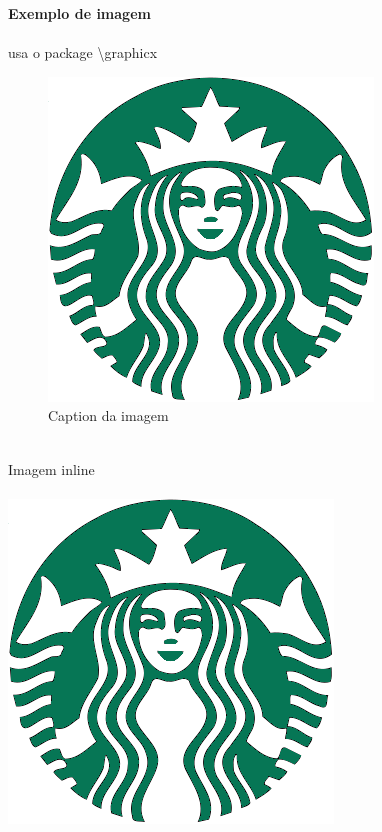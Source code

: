 \documentclass[12pt,a4paper]{article}
\makeatletter
\def\maxwidth#1{\ifdim\Gin@nat@width>#1 #1\else\Gin@nat@width\fi}
\makeatother
\begin{document}
\noindent{}\textbf{Exemplo de imagem}\\
\\ usa o package \textbackslash{graphicx}

\begin{figure}[!ht]

	\centering

	\includegraphics[width=\maxwidth{0.5\textwidth},keepaspectratio]{image.png}
	\caption{Caption da imagem} 
	\label{Label da imagem} 

\end{figure}

\noindent\\
\noindent Imagem inline\\
\noindent\\
\lipsum
\includegraphics[width=\maxwidth{0.5\textwidth}, height=\textheight,keepaspectratio]{image.png}
\lipsum
\end{document}
